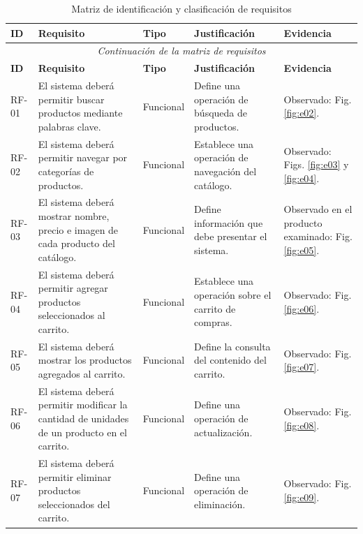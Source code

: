 \begin{landscape}
\begingroup
\footnotesize
\setlength{\tabcolsep}{3pt}
\renewcommand{\arraystretch}{1.1}


\begin{longtable}{
|p{1.4cm}|p{8cm}|p{2.5cm}|p{5.5cm}|p{3cm}|}
\caption{Matriz de identificación y clasificación de requisitos}
\label{tab:matriz_requisitos}\\
\hline
\textbf{ID} &
\textbf{Requisito} &
\textbf{Tipo} &
\textbf{Justificación} &
\textbf{Evidencia} \\
\hline
\endfirsthead

\multicolumn{5}{c}{\textit{Continuación de la matriz de requisitos}}\\
\hline
\textbf{ID} &
\textbf{Requisito} &
\textbf{Tipo} &
\textbf{Justificación} &
\textbf{Evidencia} \\
\hline
\endhead


RF-01 &
El sistema deberá permitir buscar productos mediante palabras clave. &
Funcional &
Define una operación de búsqueda de productos. &
Observado: Fig. \ref{fig:e02}. \\
\hline

RF-02 &
El sistema deberá permitir navegar por categorías de productos. &
Funcional &
Establece una operación de navegación del catálogo. &
Observado: Figs. \ref{fig:e03} y \ref{fig:e04}. \\
\hline

RF-03 &
El sistema deberá mostrar nombre, precio e imagen de cada producto del catálogo. &
Funcional &
Define información que debe presentar el sistema. &
Observado en el producto examinado: Fig. \ref{fig:e05}. \\
\hline

RF-04 &
El sistema deberá permitir agregar productos seleccionados al carrito. &
Funcional &
Establece una operación sobre el carrito de compras. &
Observado: Fig. \ref{fig:e06}. \\
\hline

RF-05 &
El sistema deberá mostrar los productos agregados al carrito. &
Funcional &
Define la consulta del contenido del carrito. &
Observado: Fig. \ref{fig:e07}. \\
\hline

RF-06 &
El sistema deberá permitir modificar la cantidad de unidades de un producto en el carrito. &
Funcional &
Define una operación de actualización. &
Observado: Fig. \ref{fig:e08}. \\
\hline

RF-07 &
El sistema deberá permitir eliminar productos seleccionados del carrito. &
Funcional &
Define una operación de eliminación. &
Observado: Fig. \ref{fig:e09}. \\
\hline


\end{longtable}
\end{landscape}
